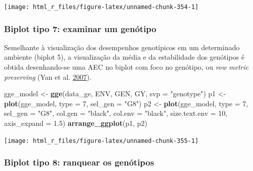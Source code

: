 \documentclass[
]{book}
\newenvironment{Shaded}{\begin{snugshade}}{\end{snugshade}}
\newcommand{\DataTypeTok}[1]{\textcolor[rgb]{0.13,0.29,0.53}{#1}}
\newcommand{\DecValTok}[1]{\textcolor[rgb]{0.00,0.00,0.81}{#1}}
\newcommand{\FloatTok}[1]{\textcolor[rgb]{0.00,0.00,0.81}{#1}}
\newcommand{\KeywordTok}[1]{\textcolor[rgb]{0.13,0.29,0.53}{\textbf{#1}}}
\newcommand{\NormalTok}[1]{#1}
\newcommand{\StringTok}[1]{\textcolor[rgb]{0.31,0.60,0.02}{#1}}
\numberwithin{equation}{section}
\newcommand{\indt}[1]{\index{#1|ST}}
\begin{document}
\begin{center}\texttt{[image: html\_r\_files/figure-latex/unnamed-chunk-354-1]} \end{center}

\hypertarget{biplot-tipo-7-examinar-um-genuxf3tipo}{%
\subsubsection{Biplot tipo 7: examinar um genótipo}\label{biplot-tipo-7-examinar-um-genuxf3tipo}}

Semelhante à visualização dos desempenhos genotípicos em um determinado ambiente (biplot 5), a visualização da média e da estabilidade dos genótipos é obtida desenhando-se uma AEC no biplot com foco no genótipo, ou \emph{row metric preserving} (Yan et al. \protect\hyperlink{ref-Yan2007}{2007}).
\indt{biplot}

\begin{Shaded}
\begin{Highlighting}[]
\NormalTok{gge\_model \textless{}{-}}\StringTok{ }\KeywordTok{gge}\NormalTok{(data\_ge, ENV, GEN, GY, }\DataTypeTok{svp =} \StringTok{"genotype"}\NormalTok{)}
\NormalTok{p1 \textless{}{-}}\StringTok{ }\KeywordTok{plot}\NormalTok{(gge\_model, }\DataTypeTok{type =} \DecValTok{7}\NormalTok{, }\DataTypeTok{sel\_gen =} \StringTok{"G8"}\NormalTok{)}
\NormalTok{p2 \textless{}{-}}\StringTok{ }\KeywordTok{plot}\NormalTok{(gge\_model,}
           \DataTypeTok{type =} \DecValTok{7}\NormalTok{,}
           \DataTypeTok{sel\_gen =} \StringTok{"G8"}\NormalTok{,}
           \DataTypeTok{col.gen =} \StringTok{"black"}\NormalTok{,}
           \DataTypeTok{col.env =} \StringTok{"black"}\NormalTok{,}
           \DataTypeTok{size.text.env =} \DecValTok{10}\NormalTok{,}
           \DataTypeTok{axis\_expand =} \FloatTok{1.5}\NormalTok{)}
\KeywordTok{arrange\_ggplot}\NormalTok{(p1, p2)}
\end{Highlighting}
\end{Shaded}

\begin{center}\texttt{[image: html\_r\_files/figure-latex/unnamed-chunk-355-1]} \end{center}

\hypertarget{biplot-tipo-8-ranquear-os-genuxf3tipos}{%
\subsubsection{Biplot tipo 8: ranquear os genótipos}\label{biplot-tipo-8-ranquear-os-genuxf3tipos}}
\end{document}
